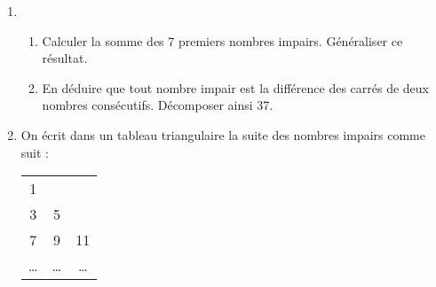 \documentclass[12 pt]{extarticle}
\theoremstyle{plain}
\begin{document}
\begin{enumerate}
\begin{enumerate}
\end{enumerate}
\item \begin{enumerate}
\item Calculer la somme des 7 premiers nombres impairs.
Généraliser ce résultat. 
\item En déduire que tout nombre impair est la 
différence des carrés de deux nombres consécutifs.
Décomposer ainsi 37.
\end{enumerate}
\item On écrit dans un tableau triangulaire la suite des nombres impairs comme suit : \\
 \begin{tabular}{ccc}
1 & & \\
3 & 5 & \\
7 & 9 & 11  \\
\ldots & \ldots & \ldots\\


\end{tabular}
\end{enumerate}
\end{document}
